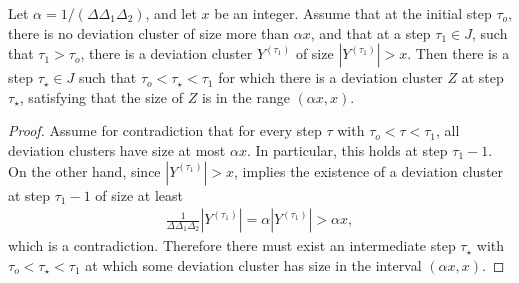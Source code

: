 \begin{corollary}
  \label{claim:inter}
  Let $\alpha = 1 / (\Delta\Delta_{1}\Delta_{2})$, and let $x$ be an integer. Assume that at the initial step $\tau_{o}$, there is no deviation cluster of size more than $\alpha x$, and that at a step $\tau_{1} \in J$, such that $\tau_{1} > \tau_{o}$, there is a deviation cluster $Y^{(\tau_{1})}$ of size $|Y^{(\tau_{1})}| > x$. Then there is a step $\tau_{\star} \in J$ such that $\tau_{o} < \tau_{\star} < \tau_{1}$ for which there is a deviation cluster $Z$ at step $\tau_{\star}$, satisfying that the size of $Z$ is in the range $(\alpha x, x)$.
\end{corollary}
\begin{proof}
Assume for contradiction that for every step $\tau$ with $\tau_{o}<\tau<\tau_{1}$, all deviation clusters have size at most $\alpha x$. In particular, this holds at step $\tau_{1}-1$. On the other hand, since $|Y^{(\tau_{1})}|>x$,  implies the existence of a deviation cluster at step $\tau_{1}-1$ of size at least
\begin{equation*}
  \begin{split}
    \frac{1}{\Delta\Delta_{1}\Delta_{2}}|Y^{(\tau_{1})}| = \alpha |Y^{(\tau_{1})}| > \alpha x,
  \end{split}
\end{equation*}
which is a contradiction. Therefore there must exist an intermediate step $\tau_{\star}$ with $\tau_{o}<\tau_{\star}<\tau_{1}$ at which some deviation cluster has size in the interval $(\alpha x,x)$.
\end{proof}

